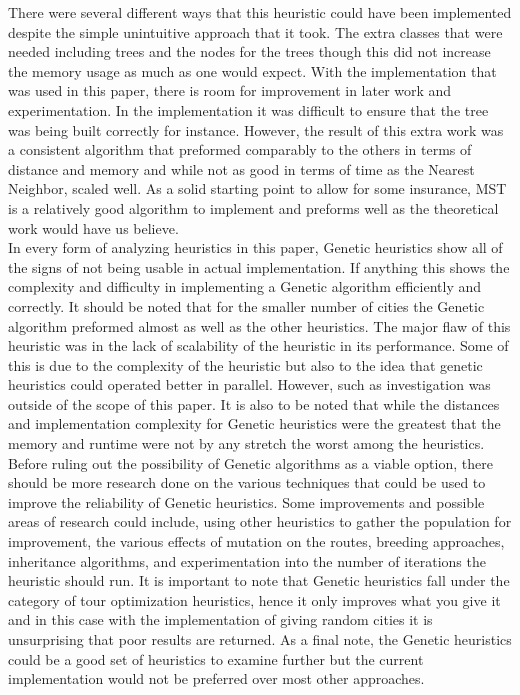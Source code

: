 \documentclass[midd]{thesis}
\newcommand{\tab}{\hspace*{2em}}
\begin{document}
\tab There were several different ways that this heuristic could have been implemented despite the simple unintuitive approach that it took. The extra classes that were needed including trees and the nodes for the trees though this did not increase the memory usage as much as one would expect. With the implementation that was used in this paper, there is room for improvement in later work and experimentation. In the implementation it was difficult to ensure that the tree was being built correctly for instance. However, the result of this extra work was a consistent algorithm that preformed comparably to the others in terms of distance and memory and while not as good in terms of time as the Nearest Neighbor, scaled well. As a solid starting point to allow for some insurance, MST is a relatively good algorithm to implement and preforms well as the theoretical work would have us believe.\\
\tab In every form of analyzing heuristics in this paper, Genetic heuristics show all of the signs of not being usable in actual implementation. If anything this shows the complexity and difficulty in implementing a Genetic algorithm efficiently and correctly. It should be noted that for the smaller number of cities the Genetic algorithm preformed almost as well as the other heuristics. The major flaw of this heuristic was in the lack of scalability of the heuristic in its performance. Some of this is due to the complexity of the heuristic but also to the idea that genetic heuristics could operated better in parallel. However, such as investigation was outside of the scope of this paper. It is also to be noted that while the distances and implementation complexity for Genetic heuristics were the greatest that the memory and runtime were not by any stretch the worst among the heuristics.\\
\tab Before ruling out the possibility of Genetic algorithms as a viable option, there should be more research done on the various techniques that could be used to improve the reliability of Genetic heuristics. Some improvements and possible areas of research could include, using other heuristics to gather the population for improvement, the various effects of mutation on the routes, breeding approaches, inheritance algorithms, and experimentation into the number of iterations the heuristic should run. It is important to note that Genetic heuristics fall under the category of tour optimization heuristics, hence it only improves what you give it and in this case with the implementation of giving random cities it is unsurprising that poor results are returned. As a final note, the Genetic heuristics could be a good set of heuristics to examine further but the current implementation would not be preferred over most other approaches.\\
\end{document}
